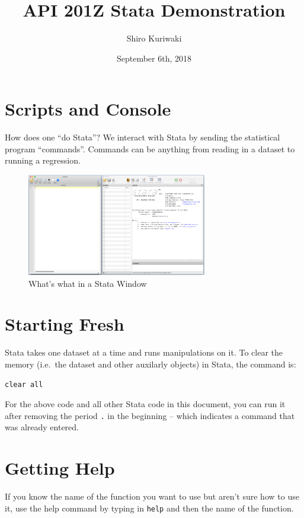 \documentclass[]{article}
\title{API 201Z Stata Demonstration}
\author{Shiro Kuriwaki}
\date{September 6th, 2018}
\begin{document}
\maketitle

\section{Scripts and Console}\label{scripts-and-console}

How does one ``do Stata''? We interact with Stata by sending the
statistical program ``commands''. Commands can be anything from reading
in a dataset to running a regression.

\begin{figure}
\centering
\includegraphics[width=0.70000\textwidth]{statawindow.png}
\caption{What's what in a Stata Window}
\end{figure}

\section{Starting Fresh}\label{starting-fresh}

Stata takes one dataset at a time and runs manipulations on it. To clear
the memory (i.e.~the dataset and other auxilarly objects) in Stata, the
command is:

\begin{verbatim}
clear all
\end{verbatim}

For the above code and all other Stata code in this document, you can
run it after removing the period \texttt{.} in the beginning -- which
indicates a command that was already entered.

\section{Getting Help}\label{getting-help}

If you know the name of the function you want to use but aren't sure how
to use it, use the help command by typing in \texttt{help} and then the
name of the function.
\end{document}
